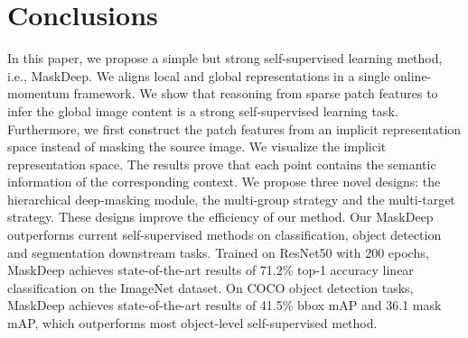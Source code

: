\documentclass[10pt,twocolumn,letterpaper]{article}
\begin{document}
\section{Conclusions}
In this paper, we propose a simple but strong self-supervised learning method, i.e., MaskDeep. We aligns local and global representations in a single online-momentum framework. We show that reasoning from sparse patch features to infer the global image content is a strong self-supervised learning task. Furthermore, we first construct the patch features from an implicit representation space instead of masking the source image. We visualize the implicit representation space. The results prove that each point contains the semantic information of the corresponding context. We propose three novel designs: the hierarchical deep-masking module, the multi-group strategy and the multi-target strategy. These designs improve the efficiency of our method. Our MaskDeep outperforms current self-supervised methods on classification, object detection and segmentation downstream tasks. Trained on ResNet50 with 200 epochs, MaskDeep achieves state-of-the-art results of 71.2\% top-1 accuracy linear classification on the ImageNet dataset. On COCO object detection tasks, MaskDeep achieves state-of-the-art results of 41.5\% bbox mAP and 36.1 mask mAP, which outperforms most object-level self-supervised method. 

{\small


}
\end{document}

